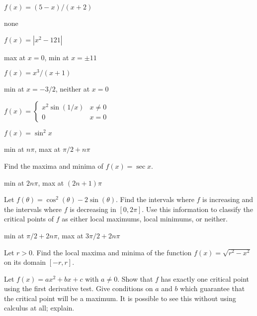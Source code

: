 \begin{exercises}
\begin{exercise}
$f(x) = (5-x)/(x+2)$
\begin{answer} none
\end{answer}\end{exercise}

\begin{exercise} $f(x) = |x^2 - 121|$
\begin{answer} max at $x=0$, min at $x=\pm 11$
\end{answer}\end{exercise}

\begin{exercise} $f(x) = x^3/(x+1)$
\begin{answer} min at $x=-3/2$, neither at $x=0$
\end{answer}\end{exercise}

\begin{exercise} $f(x)= \begin{cases}
x^2 \sin(1/x)  & x\neq 0  \\
 0  & x=0 \end{cases}$
\end{exercise}

\begin{exercise} $f(x) = \sin ^2 x$
\begin{answer} min at $n\pi$, max at $\pi/2+n\pi$
\end{answer}\end{exercise}

\endtwocol
\bsk
\begin{exercise} Find the maxima and minima of $f(x)=\sec x$.
\begin{answer} min at $2n\pi$, max at $(2n+1)\pi$
\end{answer}\end{exercise}

\begin{exercise}  Let $f(\theta) = \cos^2(\theta) -
 2\sin(\theta)$.  Find the intervals where $f$ is increasing and the
 intervals where $f$ is decreasing in $[0,2\pi]$.  Use this
 information to classify the critical points of $f$ as either local
 maximums, local minimums, or neither.
\begin{answer} min at $\pi/2+2n\pi$, max at $3\pi/2+2n\pi$
\end{answer}\end{exercise}

\begin{exercise} Let $r>0$. Find the local
maxima and minima of the function $f(x)
=\sqrt{r^2 -x^2 }$ on its domain $[-r,r]$.
\end{exercise}

\begin{exercise} Let $f(x) =a x^2 + bx + c$ with $a\neq 0$. Show that $f$
has exactly one critical point using the first derivative test. Give
conditions on $a$ and $b$ which guarantee that the critical point will
be a maximum. It is possible to see this without using calculus at
all; explain.
\end{exercise}

\end{exercises}





